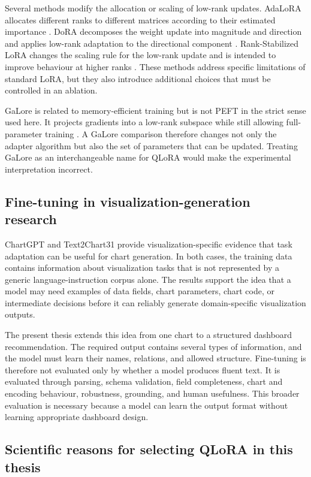 Several methods modify the allocation or scaling of low-rank updates. AdaLoRA allocates different ranks to different matrices according to their estimated importance \cite{zhang2023adalora}. DoRA decomposes the weight update into magnitude and direction and applies low-rank adaptation to the directional component \cite{liu2024dora}. Rank-Stabilized LoRA changes the scaling rule for the low-rank update and is intended to improve behaviour at higher ranks \cite{kalajdzievski2023rslora}. These methods address specific limitations of standard LoRA, but they also introduce additional choices that must be controlled in an ablation.

GaLore is related to memory-efficient training but is not PEFT in the strict sense used here. It projects gradients into a low-rank subspace while still allowing full-parameter training \cite{zhao2024galore}. A GaLore comparison therefore changes not only the adapter algorithm but also the set of parameters that can be updated. Treating GaLore as an interchangeable name for QLoRA would make the experimental interpretation incorrect.

\subsection{Fine-tuning in visualization-generation research}

ChartGPT and Text2Chart31 provide visualization-specific evidence that task adaptation can be useful for chart generation. In both cases, the training data contains information about visualization tasks that is not represented by a generic language-instruction corpus alone. The results support the idea that a model may need examples of data fields, chart parameters, chart code, or intermediate decisions before it can reliably generate domain-specific visualization outputs.

The present thesis extends this idea from one chart to a structured dashboard recommendation. The required output contains several types of information, and the model must learn their names, relations, and allowed structure. Fine-tuning is therefore not evaluated only by whether a model produces fluent text. It is evaluated through parsing, schema validation, field completeness, chart and encoding behaviour, robustness, grounding, and human usefulness. This broader evaluation is necessary because a model can learn the output format without learning appropriate dashboard design.

\subsection{Scientific reasons for selecting QLoRA in this thesis}

